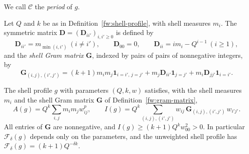We call $\mathcal C$ the \emph{period} of $g$.

\begin{definition}\label{fw:gram-matrix}
Let $Q$ and $k$ be as in Definition~\ref{fw:shell-profile}, with shell
measures $m_i$. The symmetric matrix $\mathbf D=(\mathbf D_{ii'})_{i,i'\ge0}$
is defined by
\[
 \mathbf D_{ii'}=m_{\min(i,i')}\ (i\ne i'),\qquad \mathbf D_{00}=0,\qquad
 \mathbf D_{ii}=im_i-Q^{i-1}\ (i\ge1),
\]
and the \emph{shell Gram matrix} $\mathbf G$, indexed by pairs of pairs of
nonnegative integers, by
\[
 \mathbf G_{(i,j),(i',j')}=(k+1)m_im_j\mathbf 1_{i=i',\,j=j'}
 +m_j\mathbf D_{ii'}\mathbf 1_{j=j'}+m_i\mathbf D_{jj'}\mathbf 1_{i=i'}.
\]
\end{definition}

\begin{lemma}\label{fw:shell-lemma}
The shell profile $g$ with parameters $(Q,k,w)$ satisfies, with the shell
measures $m_i$ and the shell Gram matrix $\mathbf G$ of
Definition~\ref{fw:gram-matrix},
\begin{equation}\label{fw:shell-kernel}
 A(g)=Q^k\sum_{i,j}m_im_jw_{ij}^p,\qquad
 I(g)=Q^k\sum_{(i,j),(i',j')}w_{ij}\,\mathbf G_{(i,j),(i',j')}\,w_{i'j'} .
\end{equation}
All entries of $\mathbf G$ are nonnegative, and
$I(g)\ge(k+1)Q^kw_{00}^2>0$. In particular $\mathcal F_\delta(g)$
depends only on the parameters, and the unweighted shell profile has
$\mathcal F_\delta(g)=(k+1)Q^{-\delta k}$.
\end{lemma}

